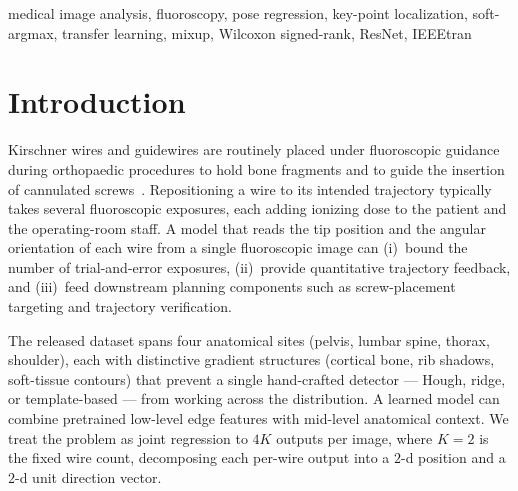 \documentclass[conference,10pt,letterpaper]{IEEEtran}
\begin{document}
\begin{IEEEkeywords}
medical image analysis, fluoroscopy, pose regression, key-point
localization, soft-argmax, transfer learning, mixup, Wilcoxon signed-rank,
ResNet, IEEEtran
\end{IEEEkeywords}

\section{Introduction}
\label{sec:intro}

Kirschner wires and guidewires are routinely placed under fluoroscopic
guidance during orthopaedic procedures to hold bone fragments and to guide
the insertion of cannulated screws~\cite{routt1997}. Repositioning a wire
to its intended trajectory typically takes several fluoroscopic
exposures, each adding ionizing dose to the patient and the operating-room
staff. A model that reads the tip position and the angular orientation of
each wire from a single fluoroscopic image can (i)~bound the number of
trial-and-error exposures, (ii)~provide quantitative trajectory feedback,
and (iii)~feed downstream planning components such as screw-placement
targeting and trajectory verification.

The released dataset spans four anatomical sites (pelvis, lumbar spine,
thorax, shoulder), each with distinctive gradient structures (cortical
bone, rib shadows, soft-tissue contours) that prevent a single hand-crafted
detector --- Hough, ridge, or template-based --- from working across the
distribution. A learned model can combine pretrained low-level edge
features with mid-level anatomical context. We treat the problem as
joint regression to $4K$ outputs per image, where $K{=}2$ is the fixed
wire count, decomposing each per-wire output into a $2$-d position and a
$2$-d unit direction vector.
\end{document}
